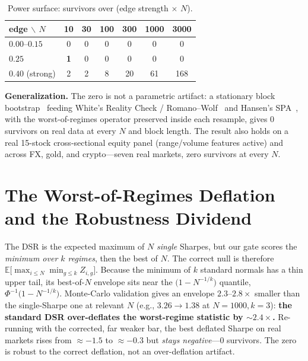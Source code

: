 \documentclass[conference]{IEEEtran}
\begin{document}
\begin{table}[t]\centering
\caption{Power surface: survivors over (edge strength $\times$ $N$).}
\label{tab:power}
\begin{tabular}{lcccccc}
\toprule
edge $\backslash$ $N$ & 10 & 30 & 100 & 300 & 1000 & 3000\\
\midrule
$0.00$--$0.15$ & 0 & 0 & 0 & 0 & 0 & 0\\
$0.25$ & \textbf{1} & 0 & 0 & 0 & 0 & 0\\
$0.40$ (strong) & 2 & 2 & 8 & 20 & 61 & 168\\
\bottomrule
\end{tabular}
\end{table}

\textbf{Generalization.} The zero is not a parametric artifact: a stationary block
bootstrap~\cite{politis} feeding White's Reality Check / Romano--Wolf~\cite{rc,romanowolf} and
Hansen's SPA~\cite{spa}, with the worst-of-regimes operator preserved inside each resample,
gives 0 survivors on real data at every $N$ and block length. The result also holds on a real
15-stock cross-sectional equity panel (range/volume features active) and across FX, gold, and
crypto---seven real markets, zero survivors at every $N$.

\section{The Worst-of-Regimes Deflation and the Robustness Dividend}\label{sec:deflation}
The DSR is the expected maximum of $N$ \emph{single} Sharpes, but our gate scores the
\emph{minimum over $k$ regimes}, then the best of $N$. The correct null is therefore
$\mathbb{E}\big[\max_{i\le N}\min_{g\le k} Z_{i,g}\big]$. Because the minimum of $k$ standard
normals has a thin upper tail, its best-of-$N$ envelope sits near the
$\big(1-N^{-1/k}\big)$ quantile, $\Phi^{-1}\!\big(1-N^{-1/k}\big)$. Monte-Carlo validation
gives an envelope $2.3$--$2.8\times$ smaller than the single-Sharpe one at relevant $N$ (e.g.,
$3.26\!\to\!1.38$ at $N{=}1000,k{=}3$): \textbf{the standard DSR over-deflates the
worst-regime statistic by ${\sim}2.4\times$.} Re-running with the corrected, far weaker bar,
the best deflated Sharpe on real markets rises from ${\approx}{-}1.5$ to ${\approx}{-}0.3$ but
\emph{stays negative}---0 survivors. The zero is robust to the correct deflation, not an
over-deflation artifact.
\end{document}

